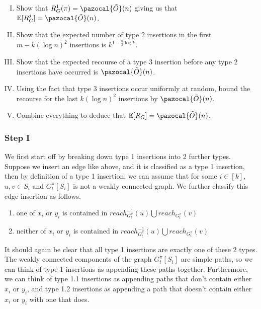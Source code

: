 \documentclass{article}
\begin{document}
\begin{enumerate}[I.]
    \item Show that $R_{G}^{1}(\pi)=\pazocal{\tilde{O}}(n)$ giving us that $\mathbb{E}[R_{G}^{j}]=\pazocal{\tilde{O}}(n)$.
    \item Show that the expected number of type 2 insertions in the first $m-k(\log n)^2$ insertions is $k^{1-\frac{8}{3}\log k}$.
    \item Show that the expected recourse of a type 3 insertion before any type 2 insertions have occurred is $\pazocal{\tilde{O}}(n)$.
    \item Using the fact that type 3 insertions occur uniformly at random, bound the recourse for the last $k(\log n)^2$ insertions by $\pazocal{\tilde{O}}(n) $.
    \item Combine everything to deduce that $\mathbb{E}[R_{G}]=\pazocal{\tilde{O}}(n)$.
\end{enumerate}

\subsubsection{Step I}

We first start off by breaking down type 1 insertions into 2 further types. Suppose we insert an edge like above, and it is classified as a type 1 insertion, then by definition of a type 1 insertion, we can assume that for some $i \in [k]$, $u,v \in S_{i}$ and $G_{t}^{\pi}[S_{i}]$ is not a weakly connected graph. We further classify this edge insertion as follows.

\begin{enumerate}[Type {1}.1]
    \item one of $x_{i}$ or $y_{i}$ is contained in $reach^{-1}_{G_{t}^{\pi}}(u) \bigcup reach_{G_{t}^{\pi}}(v)$
    \item neither of $x_{i}$ or $y_{i}$ is contained in $reach^{-1}_{G_{t}^{\pi}}(u) \bigcup reach_{G_{t}^{\pi}}(v)$
\end{enumerate}

It should again be clear that all type 1 insertions are exactly one of these 2 types. The weakly connected components of the graph $G_{t}^{\pi}[S_{i}]$ are simple paths, so we can think of type 1 insertions as appending these paths together. Furthermore, we can think of type 1.1 insertions as appending paths that don't contain either $x_{i}$ or $y_{i}$, and type 1.2 insertions as appending a path that doesn't contain either $x_{i}$ or $y_{i}$ with one that does.
\end{document}
